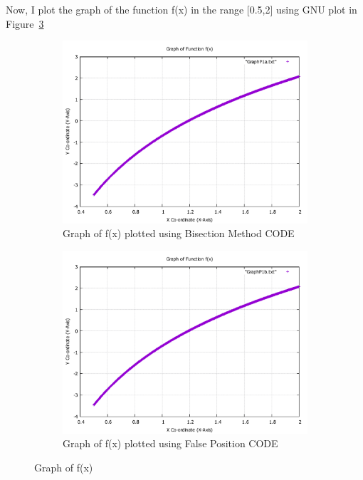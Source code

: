 \documentclass[titlepage, 11pt]{article}
\begin{document}
Now,  I plot the graph of the function f(x) in the range [0.5,2] using GNU plot in Figure~\ref{fig:Graph1}\\

\begin{figure}
\begin{subfigure}{.5\textwidth}
  \centering
  \includegraphics[width=\linewidth]{GraphP1a.pdf}
  \caption{Graph of f(x) plotted using Bisection Method CODE}
  \label{fig:fig1a}
\end{subfigure}
\begin{subfigure}{.5\textwidth}
  \centering
  \includegraphics[width=\linewidth]{GraphP1b.pdf}
  \caption{Graph of f(x) plotted using False Position CODE}
  \label{fig:fig1b}
\end{subfigure}
\caption{Graph of f(x) }
\label{fig:Graph1}
\end{figure}
\end{document}
